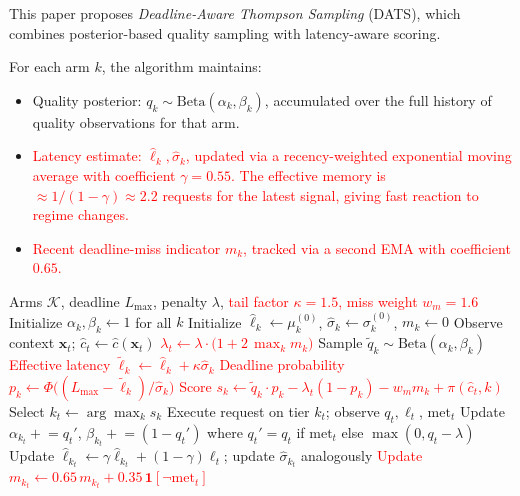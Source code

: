 \documentclass[final,3p,twocolumn,authoryear]{elsarticle}
\newcommand{\rev}[1]{\textcolor{red}{#1}}
\theoremstyle{plain}
\theoremstyle{definition}
\begin{document}
This paper proposes \emph{Deadline-Aware Thompson Sampling} (DATS), which combines posterior-based quality sampling with latency-aware scoring.

For each arm $k$, the algorithm maintains:
\begin{itemize}
  \item Quality posterior: $q_k \sim \text{Beta}(\alpha_k, \beta_k)$, accumulated over the full history of quality observations for that arm.
  \item \rev{Latency estimate: $\hat{\ell}_k, \hat{\sigma}_k$, updated via a recency-weighted exponential moving average with coefficient $\gamma{=}0.55$. The effective memory is $\approx 1/(1-\gamma)\!\approx\!2.2$ requests for the latest signal, giving fast reaction to regime changes.}
  \item \rev{Recent deadline-miss indicator $m_k$, tracked via a second EMA with coefficient $0.65$.}
\end{itemize}

\begin{algorithm}[t]
\caption{\rev{Deadline-Aware Thompson Sampling (DATS, revised)}}
\label{alg:dats}
\begin{algorithmic}[1]
\Require Arms $\mathcal{K}$, deadline $L_{\max}$, penalty $\lambda$, \rev{tail factor $\kappa{=}1.5$, miss weight $w_m{=}1.6$}
\State Initialize $\alpha_k, \beta_k \gets 1$ for all $k$
\State Initialize $\hat{\ell}_k \gets \mu_k^{(0)}$, $\hat{\sigma}_k \gets \sigma_k^{(0)}$, $m_k \gets 0$
  \State Observe context $\mathbf{x}_t$; $\hat{c}_t \gets \hat{c}(\mathbf{x}_t)$
  \State \rev{$\lambda_t \gets \lambda \cdot \big(1 + 2\,\max_k m_k\big)$} 
    \State Sample $\tilde{q}_k \sim \text{Beta}(\alpha_k, \beta_k)$
    \State \rev{Effective latency $\tilde{\ell}_k \gets \hat{\ell}_k + \kappa \hat{\sigma}_k$} 
    \State \rev{Deadline probability $p_k \gets \Phi\big((L_{\max} - \tilde{\ell}_k) / \hat{\sigma}_k\big)$}
    \State \rev{Score $s_k \gets \tilde{q}_k \cdot p_k - \lambda_t (1 - p_k) - w_m m_k + \pi(\hat{c}_t, k)$} 
  \EndFor
  \State Select $k_t \gets \arg\max_k s_k$
  \State Execute request on tier $k_t$; observe $q_t, \ell_t$, $\mathrm{met}_t$
  \State Update $\alpha_{k_t} \mathrel{+}= q_t'$, $\beta_{k_t} \mathrel{+}= (1 - q_t')$ where $q_t' = q_t$ if $\mathrm{met}_t$ else $\max(0, q_t-\lambda)$
  \State Update $\hat{\ell}_{k_t} \gets \gamma \hat{\ell}_{k_t} + (1-\gamma) \ell_t$; update $\hat{\sigma}_{k_t}$ analogously
  \State \rev{Update $m_{k_t} \gets 0.65\, m_{k_t} + 0.35\, \mathbf{1}[\neg \mathrm{met}_t]$}
\EndFor
\end{algorithmic}
\end{algorithm}
\end{document}
